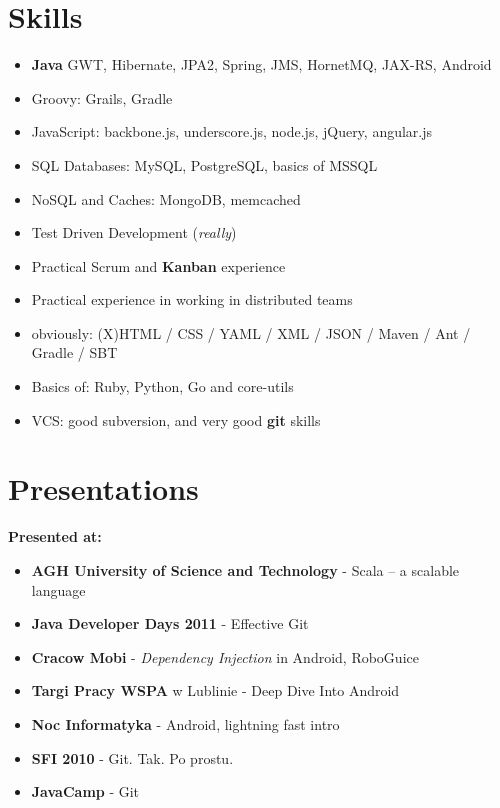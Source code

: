 \documentclass{res}
\begin{document}
\begin{resume}
\section{Skills}
\begin{itemize}
 \item \textbf{Java} GWT, Hibernate, JPA2, Spring, JMS, HornetMQ, JAX-RS, Android
 \item Groovy: Grails, Gradle
 \item JavaScript: backbone.js, underscore.js, node.js, jQuery, angular.js
 \item SQL Databases: MySQL, PostgreSQL, basics of MSSQL
 \item NoSQL and Caches: MongoDB, memcached
 \item Test Driven Development (\textit{really})
 \item Practical Scrum and \textbf{Kanban} experience
 \item Practical experience in working in distributed teams
 \item obviously: (X)HTML / CSS / YAML / XML / JSON / Maven / Ant / Gradle / SBT
 \item Basics of: Ruby, Python, Go and core-utils
 \item VCS: good subversion, and very good \textbf{git} skills
\end{itemize}

\section{Presentations}
\textbf{Presented at:}
\begin{itemize}
 \item \textbf{AGH University of Science and Technology} - Scala -- a scalable language
 \item \textbf{Java Developer Days 2011} - Effective Git
 \item \textbf{Cracow Mobi} - \textit{Dependency Injection} in Android, RoboGuice
 \item \textbf{Targi Pracy WSPA} w Lublinie - Deep Dive Into Android
 \item \textbf{Noc Informatyka} - Android, lightning fast intro
 \item \textbf{SFI 2010} - Git. Tak. Po prostu.
 \item \textbf{JavaCamp} - Git
\end{itemize}



\end{resume}
\end{document}
